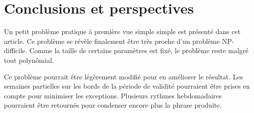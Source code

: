 \documentclass{roadef}
\begin{document}
\section{Conclusions et perspectives}

Un petit problème pratique à première vue simple simple est présenté
dans cet article. Ce problème se révèle finalement être très proche
d'un problème NP-difficile. Comme la taille de certains paramètres
est fixé, le problème reste malgré tout polynômial.

Ce problème pourrait être légèrement modifié pour en améliorer le
résultat. Les semaines partielles sur les bords de la période de
validité pourraient être prises en compte pour minimiser les
exceptions. Plusieurs rythmes hebdomadaires pourraient être retournés
pour condenser encore plus la phrase produite.



\end{document}
